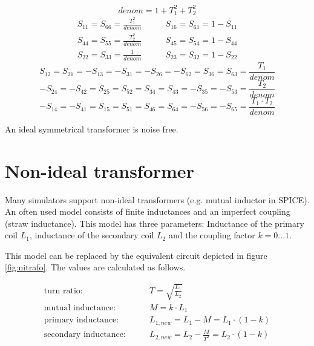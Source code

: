 \begin{equation}
denom = 1+T_1^2+T_2^2
\end{equation}
\begin{eqnarray}
S_{11} = S_{66} = \frac{T_1^2}{denom}  &  \qquad S_{16} = S_{61} = 1-S_{11} \\
S_{44} = S_{55} = \frac{T_2^2}{denom}  &  \qquad S_{45} = S_{54} = 1-S_{44} \\
S_{22} = S_{33} = \frac{1}{denom}  &  \qquad S_{23} = S_{32} = 1-S_{22}
\end{eqnarray}
\begin{equation}
S_{12} = S_{21} = -S_{13} = -S_{31} = -S_{26} = -S_{62} = S_{36} = S_{63}
       = \frac{T_1}{denom}
\end{equation}
\begin{equation}
-S_{24} = -S_{42} = S_{25} = S_{52} = S_{34} = S_{43} = -S_{35} = -S_{53}
       = \frac{T_2}{denom}
\end{equation}
\begin{equation}
-S_{14} = -S_{41} = S_{15} = S_{51} = S_{46} = S_{64} = -S_{56} = -S_{65}
       = \frac{T_1\cdot T_2}{denom}
\end{equation}

An ideal symmetrical transformer is noise free.


\section{Non-ideal transformer}

Many simulators support non-ideal transformers (e.g. mutual inductor
in SPICE).  An often used model consists of finite inductances and an
imperfect coupling (straw inductance).  This model has three
parameters: Inductance of the primary coil $L_1$, inductance of the
secondary coil $L_2$ and the coupling factor $k=0...1$.

\addvspace{12pt}

This model can be replaced by the equivalent circuit depicted in
figure \ref{fig:nitrafo}.  The values are calculated as follows.

\begin{align}
\textrm{turn ratio:} & \qquad  T = \sqrt{\frac{L_1}{L_2}}\\
\textrm{mutual inductance:}  & \qquad M = k\cdot L_1\\
\textrm{primary inductance:}  & \qquad L_{1,new} = L_1 - M = L_1\cdot (1-k)\\
\textrm{secondary inductance:}  & \qquad L_{2,new} = L_2 - \frac{M}{T^2} = L_2\cdot (1-k)
\end{align}

